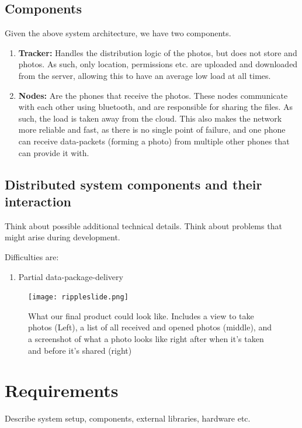 \documentclass{report}
\newcommand{\lfig}[1]{\label{fig:#1}}
\begin{document}
\subsection{Components}
Given the above system architecture, we have two components. 

\begin{enumerate}
\item \textbf{Tracker:} Handles the distribution logic of the photos, but does not store and photos. As such, only location, permissions etc. are uploaded and downloaded from the server, allowing this to have an average low load at all times. 
\item \textbf{Nodes:} Are the phones that receive the photos. These nodes communicate with each other using bluetooth, and are responsible for sharing the files. As such, the load is taken away from the cloud. This also makes the network more reliable and fast, as there is no single point of failure, and one phone can receive data-packets (forming a photo) from multiple other phones that can provide it with.
\end{enumerate}

\subsection{Distributed system components and their interaction}
Think about possible additional technical details.
Think about problems that might arise during development.

Difficulties are:
\begin{enumerate}
\item Partial data-package-delivery
\end{enumerate}

\begin{figure}[h]
	\centering
    \texttt{[image: rippleslide.png]}
    \lfig{example}
    \vspace{-5mm} %
	\caption{What our final product could look like. Includes a view to take photos (Left), a list of all received and opened photos (middle), and a screenshot of what a photo looks like right after when it's taken and before it's shared (right)}
\end{figure}



\section{Requirements}
Describe system setup, components, external libraries, hardware etc.
\end{document}
